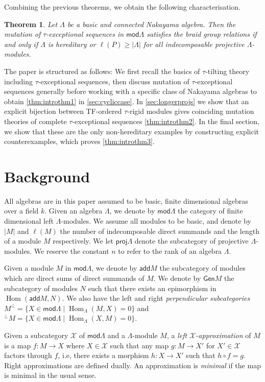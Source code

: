 \documentclass[11pt]{amsart}
\newcommand{\add}{\mathsf{add}}
\newcommand{\Gen}{\mathsf{Gen}}
\newcommand{\mods}{\mathsf{mod}}
\newcommand{\proj}{\mathsf{proj}}
\DeclareMathOperator{\Hom}{\mathrm{Hom}}
\newtheorem{theorem}{Theorem}[section]
\theoremstyle{definition}
\begin{document}
Combining the previous theorems, we obtain the following characterisation.
\begin{theorem}\label{thm:introthm4}
    Let $\Lambda$ be a basic and connected Nakayama algebra. Then the mutation of $\tau$-exceptional sequences in $\mods \Lambda$ satisfies the braid group relations if and only if $\Lambda$ is hereditary or $\ell(P) \geq |\Lambda|$ for all indecomposable projective $\Lambda$-modules.
\end{theorem}


The paper is structured as follows: We first recall the basics of $\tau$-tilting theory including $\tau$-exceptional sequences, then discuss mutation of $\tau$-exceptional sequences generally before working with a specific class of Nakayama algebras to obtain \cref{thm:introthm1} in \cref{sec:cycliccase}. In \cref{sec:longerprojs} we show that an explicit bijection between TF-ordered $\tau$-rigid modules gives coinciding mutation theories of complete $\tau$-exceptional sequences \cref{thm:introthm2}. In the final section, we show that these are the only non-hereditary examples by constructing explicit counterexamples, which proves \cref{thm:introthm3}.

\section{Background}
All algebras are in this paper assumed to be basic, finite dimensional algebras over a field $k$. Given an algebra $\Lambda$, we denote by $\mods \Lambda$ the category of finite dimensional left $\Lambda$-modules. We assume all modules to be basic, and denote by $|M|$ and $\ell(M)$ the number of indecomposable direct summands and the length of a module $M$ respectively. We let $\proj \Lambda$ denote the subcategory of projective $\Lambda$-modules. We reserve the constant $n$ to refer to the rank of an algebra $\Lambda$. 

Given a module $M$ in $\mods \Lambda$, we denote by $\add M$ the subcategory of modules which are direct sums of direct summands of $M$. We denote by $\Gen M$ the subcategory of modules $N$ such that there exists an epimorphism in $\Hom(\add M,N)$. We also have the left and right \textit{perpendicular subcategories} $M^\perp = \{X \in \mods \Lambda \mid \Hom_\Lambda(M,X) = 0\}$ and ${}^\perp M = \{X \in \mods \Lambda \mid \Hom_\Lambda(X,M) = 0\}$.

Given a subcategory $\mathcal{X}$ of $\mods \Lambda$ and a $\Lambda$-module $M$, a \textit{left $\mathcal{X}$-approximation} of $M$ is a map $f\colon M \to X$ where $X \in \mathcal{X}$ such that any map $g\colon M \to X'$ for $X' \in \mathcal{X}$ factors through $f$, i.e, there exists a morphism $h\colon X \to X'$ such that $h \circ f = g$. Right approximations are defined dually. An approximation is \textit{minimal} if the map is minimal in the usual sense.
\end{document}

